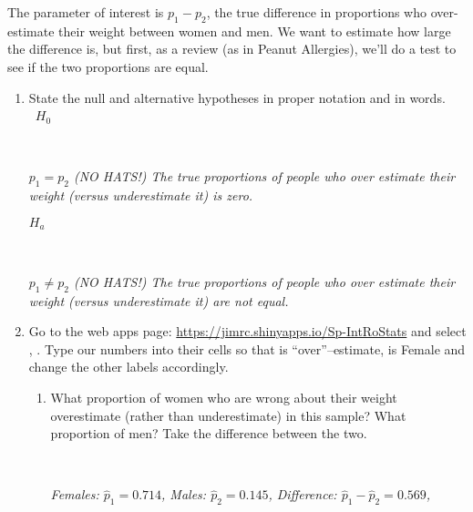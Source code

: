   The parameter of interest is $p_1 - p_2$, the true difference in
  proportions who over-estimate their weight between women and men. 
  We want to estimate how large the difference is, but first, as a
  review (as in Peanut Allergies), we'll do a test to see if the two
  proportions are equal. 
  \vspace{-.2in}
  \begin{enumerate}

  \item  State the null and alternative hypotheses in proper notation
    and in words.\\ \ 
    $H_0$
\begin{students}
 \ \   \vspace{1cm}\\
\end{students}
\begin{key}
  {\it $p_1 = p_2$  (NO HATS!) The true proportions of people who over
    estimate their weight (versus underestimate it) is zero.}
    \\
\end{key}
    $H_a$
\begin{students}
 \ \   \vspace{1cm}\\
\end{students}
\begin{key}
  {\it $p_1 \neq p_2$  (NO HATS!) The true proportions of people who over
    estimate their weight (versus underestimate it) are not equal. 
    } \\
\end{key}
    \item \label{testWeight}
   Go to the  web apps page:
   \url{https://jimrc.shinyapps.io/Sp-IntRoStats}
   and select , .  Type our numbers into
   their cells so that \fbox{Success} is  ``over''--estimate,  \fbox{Group 1} is
   Female and change the other labels accordingly.  
   \begin{enumerate}
     \item \label{refWeights} What proportion of women who are wrong
       about their weight overestimate  (rather than underestimate) in this
       sample?  What proportion of men?  Take the difference between the two. 
\begin{students}
 \ \   \vspace*{2cm}\\
\end{students}
\begin{key}
  {\it Females: $\widehat{p}_1 = 0.714$, Males: $\widehat{p}_2 =
    0.145$,  Difference: $\widehat{p}_1  - \widehat{p}_2 =    0.569$,
    } 
\end{key}


\end{enumerate}
\end{enumerate}
